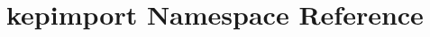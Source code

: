 \hypertarget{namespacekepimport}{\section{kepimport Namespace Reference}
\label{namespacekepimport}
}
